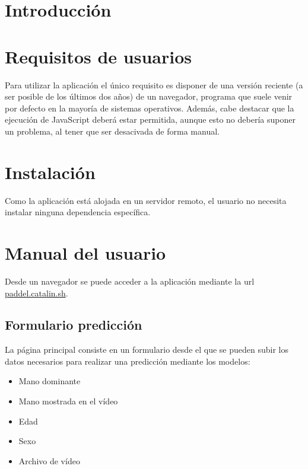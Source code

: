 \label{cha:Documentación de usuario}

\section{Introducción}



\section{Requisitos de usuarios}

Para utilizar la aplicación el único requisito es disponer de una versión
reciente (a ser posible de los últimos dos años) de un navegador, programa que
suele venir por defecto en la mayoría de sistemas operativos. Además, cabe
destacar que la ejecución de JavaScript deberá estar permitida, aunque esto no
debería suponer un problema, al tener que ser desacivada de forma manual.

\section{Instalación}

Como la aplicación está alojada en un servidor remoto, el usuario no necesita
instalar ninguna dependencia específica.

\section{Manual del usuario}

Desde un navegador se puede acceder a la aplicación mediante la url
\href{https://paddle.catalin.sh}{paddel.catalin.sh}.

\subsection{Formulario predicción}

La página principal consiste en un formulario desde el que se pueden subir los
datos necesarios para realizar una predicción mediante los modelos:

\begin{itemize}
    \item Mano dominante
    \item Mano mostrada en el vídeo
    \item Edad
    \item Sexo
    \item Archivo de vídeo
\end{itemize}


